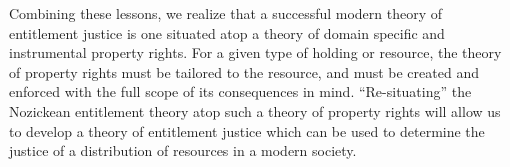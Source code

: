 Combining these lessons, we realize that a successful modern theory of 
entitlement justice is one situated atop a theory of domain specific and 
instrumental property rights. For a given type of holding or resource, the
theory of property rights must be tailored to the resource, and must be created
and enforced with the full scope of its consequences in mind. ``Re-situating''
the Nozickean entitlement theory atop such a theory of property rights will 
allow us to develop a theory of entitlement justice which can be used to
determine the justice of a distribution of resources in a modern society.
